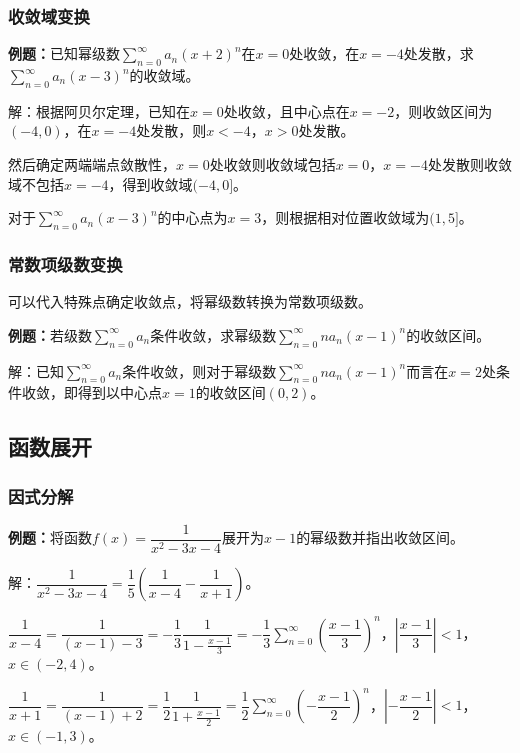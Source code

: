 \documentclass[UTF8, 12pt]{ctexart}
\begin{document}
\subsubsection{收敛域变换}

\textbf{例题：}已知幂级数$\sum\limits_{n=0}^\infty a_n(x+2)^n$在$x=0$处收敛，在$x=-4$处发散，求$\sum\limits_{n=0}^\infty a_n(x-3)^n$的收敛域。

解：根据阿贝尔定理，已知在$x=0$处收敛，且中心点在$x=-2$，则收敛区间为$(-4,0)$，在$x=-4$处发散，则$x<-4$，$x>0$处发散。

然后确定两端端点敛散性，$x=0$处收敛则收敛域包括$x=0$，$x=-4$处发散则收敛域不包括$x=-4$，得到收敛域$(-4,0]$。

对于$\sum\limits_{n=0}^\infty a_n(x-3)^n$的中心点为$x=3$，则根据相对位置收敛域为$(1,5]$。

\subsubsection{常数项级数变换}

可以代入特殊点确定收敛点，将幂级数转换为常数项级数。

\textbf{例题：}若级数$\sum\limits_{n=0}^\infty a_n$条件收敛，求幂级数$\sum\limits_{n=0}^\infty na_n(x-1)^n$的收敛区间。

解：已知$\sum\limits_{n=0}^\infty a_n$条件收敛，则对于幂级数$\sum\limits_{n=0}^\infty na_n(x-1)^n$而言在$x=2$处条件收敛，即得到以中心点$x=1$的收敛区间$(0,2)$。

\subsection{函数展开}

\subsubsection{因式分解}

\textbf{例题：}将函数$f(x)=\dfrac{1}{x^2-3x-4}$展开为$x-1$的幂级数并指出收敛区间。

解：$\dfrac{1}{x^2-3x-4}=\dfrac{1}{5}\left(\dfrac{1}{x-4}-\dfrac{1}{x+1}\right)$。

$\dfrac{1}{x-4}=\dfrac{1}{(x-1)-3}=-\dfrac{1}{3}\dfrac{1}{1-\frac{x-1}{3}}=-\dfrac{1}{3}\sum\limits_{n=0}^\infty\left(\dfrac{x-1}{3}\right)^n$，$\left\vert\dfrac{x-1}{3}\right\vert<1$，$x\in(-2,4)$。

$\dfrac{1}{x+1}=\dfrac{1}{(x-1)+2}=\dfrac{1}{2}\dfrac{1}{1+\frac{x-1}{2}}=\dfrac{1}{2}\sum\limits_{n=0}^\infty\left(-\dfrac{x-1}{2}\right)^n$，$\left\vert-\dfrac{x-1}{2}\right\vert<1$，$x\in(-1,3)$。
\end{document}
